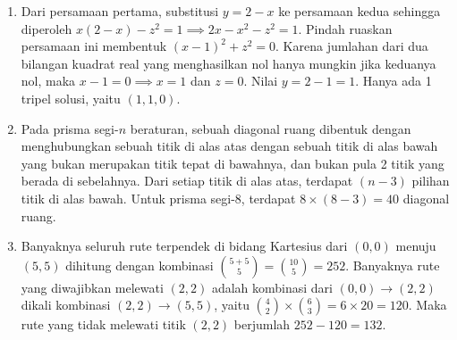 \documentclass[12pt]{scrartcl}
\begin{document}
\begin{enumerate}
\item Dari persamaan pertama, substitusi $y = 2 - x$ ke persamaan kedua sehingga diperoleh $x(2-x) - z^2 = 1 \implies 2x - x^2 - z^2 = 1$. Pindah ruaskan persamaan ini membentuk $(x-1)^2 + z^2 = 0$. Karena jumlahan dari dua bilangan kuadrat real yang menghasilkan nol hanya mungkin jika keduanya nol, maka $x-1 = 0 \implies x=1$ dan $z=0$. Nilai $y = 2-1 = 1$. Hanya ada 1 tripel solusi, yaitu $(1, 1, 0)$.

\item Pada prisma segi-$n$ beraturan, sebuah diagonal ruang dibentuk dengan menghubungkan sebuah titik di alas atas dengan sebuah titik di alas bawah yang bukan merupakan titik tepat di bawahnya, dan bukan pula 2 titik yang berada di sebelahnya. Dari setiap titik di alas atas, terdapat $(n - 3)$ pilihan titik di alas bawah. Untuk prisma segi-8, terdapat $8 \times (8-3) = 40$ diagonal ruang.

\item Banyaknya seluruh rute terpendek di bidang Kartesius dari $(0,0)$ menuju $(5,5)$ dihitung dengan kombinasi $\binom{5+5}{5} = \binom{10}{5} = 252$. Banyaknya rute yang diwajibkan melewati $(2,2)$ adalah kombinasi dari $(0,0) \to (2,2)$ dikali kombinasi $(2,2) \to (5,5)$, yaitu $\binom{4}{2} \times \binom{6}{3} = 6 \times 20 = 120$. Maka rute yang tidak melewati titik $(2,2)$ berjumlah $252 - 120 = 132$.

\end{enumerate}
\end{document}
